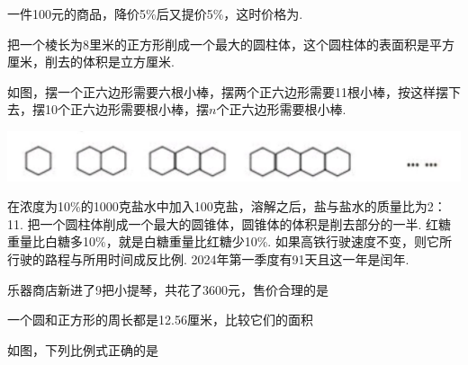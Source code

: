 \documentclass[marginline,answers]{BHCexam}
\begin{document}
\begin{questions}
\question 一件100元的商品，降价5\%后又提价5\%，这时价格为.

\question 把一个棱长为8里米的正方形削成一个最大的圆柱体，这个圆柱体的表面积是平方厘米，削去的体积是立方厘米.

\question 如图，摆一个正六边形需要六根小棒，摆两个正六边形需要11根小棒，按这样摆下去，摆10个正六边形需要根小棒，摆$n$个正六边形需要根小棒.

\begin{center}
	\includegraphics[scale=0.2]{tiankong}
\end{center}
\xuanze
\question 在浓度为10\%的1000克盐水中加入100克盐，溶解之后，盐与盐水的质量比为2：11.\xx{$\surd$}
\question 把一个圆柱体削成一个最大的圆锥体，圆锥体的体积是削去部分的一半.\xx{$\surd$}
\question 红糖重量比白糖多10\%，就是白糖重量比红糖少10\%.
\question 如果高铁行驶速度不变，则它所行驶的路程与所用时间成反比例.
\question 2024年第一季度有91天且这一年是闰年.\xx{$\surd$}

\xuanze

\question 乐器商店新进了9把小提琴，共花了3600元，售价合理的是


\begin{minipage}{0.8\textwidth}
	\question 一个圆和正方形的周长都是12.56厘米，比较它们的面积
	
	
	\question 如图，下列比例式正确的是
	
	
\end{minipage}
\begin{minipage}{0.2\textwidth}
	\begin{center}
	\end{center}
\end{minipage}


\end{questions}
\end{document}
